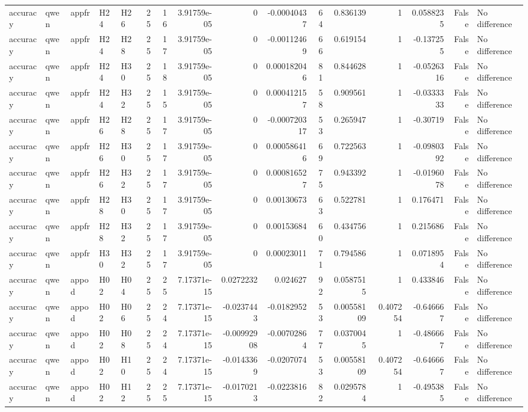 \begin{longtable}{lllllrrrrrrrrrrl}
accuracy & qwen & appfr & H24 & H26 & 25 & 16 & 3.91759e-05 & 0 & -0.00040437 & 64 & 0.836139 & 1 & 0.0588235 & False & No difference \\
accuracy & qwen & appfr & H24 & H28 & 25 & 17 & 3.91759e-05 & 0 & -0.00112469 & 66 & 0.619154 & 1 & -0.137255 & False & No difference \\
accuracy & qwen & appfr & H24 & H30 & 25 & 18 & 3.91759e-05 & 0 & 0.000182046 & 81 & 0.844628 & 1 & -0.0526316 & False & No difference \\
accuracy & qwen & appfr & H24 & H32 & 25 & 15 & 3.91759e-05 & 0 & 0.000412157 & 58 & 0.909561 & 1 & -0.0333333 & False & No difference \\
accuracy & qwen & appfr & H26 & H28 & 25 & 17 & 3.91759e-05 & 0 & -0.000720317 & 53 & 0.265947 & 1 & -0.30719 & False & No difference \\
accuracy & qwen & appfr & H26 & H30 & 25 & 17 & 3.91759e-05 & 0 & 0.000586416 & 69 & 0.722563 & 1 & -0.0980392 & False & No difference \\
accuracy & qwen & appfr & H26 & H32 & 25 & 17 & 3.91759e-05 & 0 & 0.000816527 & 75 & 0.943392 & 1 & -0.0196078 & False & No difference \\
accuracy & qwen & appfr & H28 & H30 & 25 & 17 & 3.91759e-05 & 0 & 0.00130673 & 63 & 0.522781 & 1 & 0.176471 & False & No difference \\
accuracy & qwen & appfr & H28 & H32 & 25 & 17 & 3.91759e-05 & 0 & 0.00153684 & 60 & 0.434756 & 1 & 0.215686 & False & No difference \\
accuracy & qwen & appfr & H30 & H32 & 25 & 17 & 3.91759e-05 & 0 & 0.00023011 & 71 & 0.794586 & 1 & 0.0718954 & False & No difference \\
accuracy & qwen & appod & H02 & H04 & 25 & 25 & 7.17371e-15 & 0.0272232 & 0.024627 & 92 & 0.0587515 & 1 & 0.433846 & False & No difference \\
accuracy & qwen & appod & H02 & H06 & 25 & 24 & 7.17371e-15 & -0.0237443 & -0.0182952 & 53 & 0.00558109 & 0.407254 & -0.646667 & False & No difference \\
accuracy & qwen & appod & H02 & H08 & 25 & 24 & 7.17371e-15 & -0.00992908 & -0.00702864 & 77 & 0.0370045 & 1 & -0.486667 & False & No difference \\
accuracy & qwen & appod & H02 & H10 & 25 & 24 & 7.17371e-15 & -0.0143369 & -0.0207074 & 53 & 0.00558109 & 0.407254 & -0.646667 & False & No difference \\
accuracy & qwen & appod & H02 & H12 & 25 & 25 & 7.17371e-15 & -0.0170213 & -0.0223816 & 82 & 0.0295784 & 1 & -0.495385 & False & No difference \\

\end{longtable}
